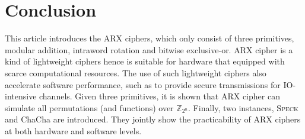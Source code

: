 \section{Conclusion}
\label{sec:conclusion}

This article introduces the ARX ciphers, which only consist of three primitives, modular
addition, intraword rotation and bitwise exclusive-or. ARX cipher is a kind of lightweight
ciphers hence is suitable for hardware that equipped with scarce computational resources.
The use of such lightweight ciphers also accelerate software performance, such as to
provide secure transmissions for IO-intensive channels. Given three primitives, it is shown
that ARX cipher can simulate all permutations (and functions) over $\mathbb{Z}_{2^n}$.
Finally, two instances, \textsc{Speck} and ChaCha are introduced. They jointly show the
practicability of ARX ciphers at both hardware and software levels.
